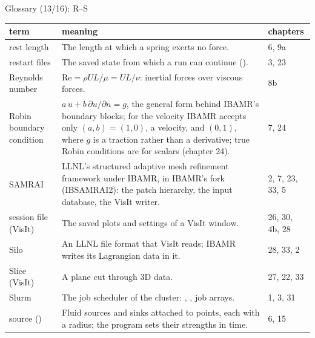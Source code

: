 \documentclass[aspectratio=169,11pt]{beamer}
\makeatletter
\newenvironment{glossarytable}{\scriptsize\renewcommand{\arraystretch}{1.08}%
  \begin{tabular}{@{}L{0.19\textwidth}L{0.63\textwidth}L{0.12\textwidth}@{}}\toprule
  term & meaning & chapters\\\midrule}{\bottomrule\end{tabular}}
\makeatother
\begin{document}
\begin{frame}{Glossary (13/16): R--S}
\label{fr:g13}
\begin{glossarytable}
rest length & The length at which a spring exerts no force. & 6, 9a\\
restart files & The saved state from which a run can continue (). & 3, 23\\
Reynolds number & $\mathrm{Re} = \rho U L/\mu = UL/\nu$: inertial forces over viscous forces. & 8b\\
Robin boundary condition & $a\,u + b\,\partial u/\partial n = g$, the general form behind IBAMR's boundary blocks; for the velocity IBAMR accepts only $(a, b) = (1, 0)$, a velocity, and $(0, 1)$, where $g$ is a traction rather than a derivative; true Robin conditions are for scalars (chapter 24). & 7, 24\\
SAMRAI & LLNL's structured adaptive mesh refinement framework under IBAMR, in IBAMR's fork (IBSAMRAI2): the patch hierarchy, the input database, the VisIt writer. & 2, 7, 23, 33, 5\\
session file (VisIt) & The saved plots and settings of a VisIt window. & 26, 30, 4b, 28\\
Silo & An LLNL file format that VisIt reads; IBAMR writes its Lagrangian data in it. & 28, 33, 2\\
Slice (VisIt) & A plane cut through 3D data. & 27, 22, 33\\
Slurm & The job scheduler of the cluster: , , job arrays. & 1, 3, 31\\
source () & Fluid sources and sinks attached to points, each with a radius; the program sets their strengths in time. & 6, 15\\
\end{glossarytable}
\end{frame}
\end{document}

